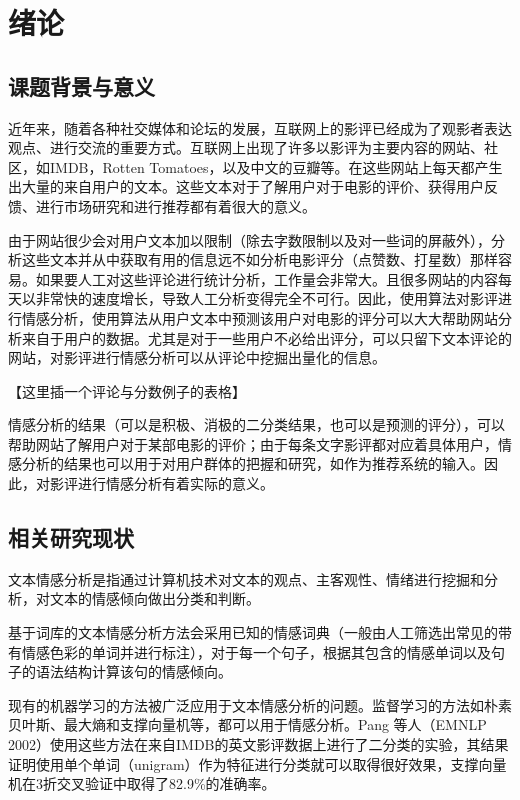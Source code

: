 \chapter{绪论}

\section{课题背景与意义}
近年来，随着各种社交媒体和论坛的发展，互联网上的影评已经成为了观影者表达观点、进行交流的重要方式。互联网上出现了许多以影评为主要内容的网站、社区，如IMDB，Rotten Tomatoes，以及中文的豆瓣等。在这些网站上每天都产生出大量的来自用户的文本。这些文本对于了解用户对于电影的评价、获得用户反馈、进行市场研究和进行推荐都有着很大的意义。

由于网站很少会对用户文本加以限制（除去字数限制以及对一些词的屏蔽外），分析这些文本并从中获取有用的信息远不如分析电影评分（点赞数、打星数）那样容易。如果要人工对这些评论进行统计分析，工作量会非常大。且很多网站的内容每天以非常快的速度增长，导致人工分析变得完全不可行。因此，使用算法对影评进行情感分析，使用算法从用户文本中预测该用户对电影的评分可以大大帮助网站分析来自于用户的数据。尤其是对于一些用户不必给出评分，可以只留下文本评论的网站，对影评进行情感分析可以从评论中挖掘出量化的信息。

【这里插一个评论与分数例子的表格】

情感分析的结果（可以是积极、消极的二分类结果，也可以是预测的评分），可以帮助网站了解用户对于某部电影的评价；由于每条文字影评都对应着具体用户，情感分析的结果也可以用于对用户群体的把握和研究，如作为推荐系统的输入。因此，对影评进行情感分析有着实际的意义。



\section{相关研究现状}
文本情感分析是指通过计算机技术对文本的观点、主客观性、情绪进行挖掘和分析，对文本的情感倾向做出分类和判断。

基于词库的文本情感分析方法会采用已知的情感词典（一般由人工筛选出常见的带有情感色彩的单词并进行标注），对于每一个句子，根据其包含的情感单词以及句子的语法结构计算该句的情感倾向。

现有的机器学习的方法被广泛应用于文本情感分析的问题。监督学习的方法如朴素贝叶斯、最大熵和支撑向量机等，都可以用于情感分析。Pang 等人（EMNLP 2002）使用这些方法在来自IMDB的英文影评数据上进行了二分类的实验，其结果证明使用单个单词（unigram）作为特征进行分类就可以取得很好效果，支撑向量机在3折交叉验证中取得了82.9\%的准确率。

